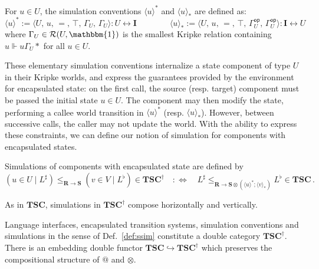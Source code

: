 \documentclass[acmsmall,screen,review,anonymous]{acmart}
\newcommand{\kw}[1]{\ensuremath{ \mathsf{#1} }}
\begin{document}
\begin{definition}
For $u \in U$,
the simulation conventions
$\langle u \rangle^*$ and
$\langle u \rangle_*$ are defined as:
\[
  \langle u \rangle^* :=
    \big\langle U,\, u,\, {=},\, \top,\, \Gamma_U,\, \Gamma_U \big\rangle
    : U \leftrightarrow \mathbf{I}
  \qquad \qquad
  \langle u \rangle_* :=
    \big\langle U,\, u,\, {=},\, \top,\, \Gamma_U^\kw{op},\, \Gamma_U^\kw{op} \big\rangle
    : \mathbf{I} \leftrightarrow U
\]
where $\Gamma_U \in \mathcal{R}(U, \mathbbm{1})$
is the smallest Kripke relation containing $u \Vdash u \mathrel{\Gamma_U} *$ for all $u \in U$.
\end{definition}

These elementary simulation conventions
internalize a state component of type $U$ in their Kripke worlds,
and express the guarantees provided by the environment
for encapsulated state:
on the first call, the source (resp. target) component
must be passed the initial state $u \in U$.
The component may then modify the state,
performing a callee world transition
in $\langle u \rangle^*$ (resp. $\langle u \rangle_*$).
However,
between successive calls,
the caller may not update the world.
With the ability to express these constraints,
we can define our notion of simulation
for components with encapsulated states.

\begin{definition} \label{def:ssim} %
Simulations of components with encapsulated state are defined by
\[
  (u \in U \mid L^\sharp)
  \le_{\mathbf{R} \rightarrow \mathbf{S}}
  (v \in V \mid L^\flat)
  \in \mathbf{TSC}^\dagger
  \quad:\Leftrightarrow\quad
  L^\sharp
  \le_{\mathbf{R} \rightarrow
       \mathbf{S} \otimes (\langle u \rangle^* \mathbin; \langle v \rangle_*)}
  L^\flat
  \in
  \mathbf{TSC}
  \,.
\]
\end{definition}

As in $\mathbf{TSC}$,
simulations in $\mathbf{TSC}^\dagger$ compose
horizontally and vertically.

\begin{theorem} %
Language interfaces, encapsulated transition systems, simulation conventions
and simulations in the sense of Def.~\ref{def:ssim}
constitute a double category $\mathbf{TSC}^\dagger$.
There is an embedding double functor $\mathbf{TSC} \hookrightarrow \mathbf{TSC}^\dagger$
which preserves the compositional structure of $\mathbin@$ and $\otimes$.
\end{theorem}

\end{document}
